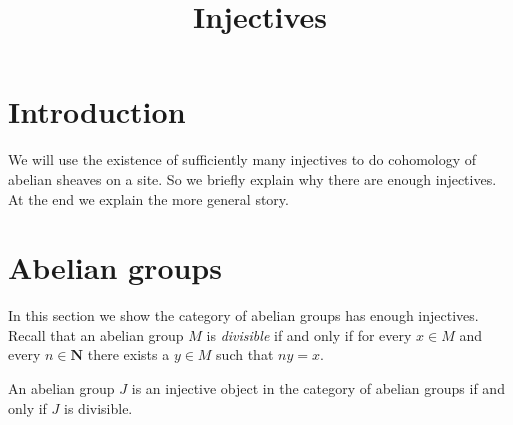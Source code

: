 

%


\title{Injectives}


\maketitle

\tableofcontents

\section{Introduction}
\label{section-introduction}

\noindent
We will use the existence of sufficiently many injectives to
do cohomology of abelian sheaves on a site. So we briefly 
explain why there are enough injectives. At the end we explain
the more general story.

\section{Abelian groups}
\label{section-abelian-groups}

\noindent
In this section we show the category of abelian groups has enough
injectives. Recall that an abelian group $M$ is {\it divisible}
if and only if for every $x \in M$ and every $n \in \mathbf{N}$
there exists a $y \in M$ such that $n y = x$.

\begin{lemma}
\label{lemma-injective-abelian}
An abelian group $J$ is an injective object in 
the category of abelian groups if and only if $J$
is divisible.
\end{lemma}

